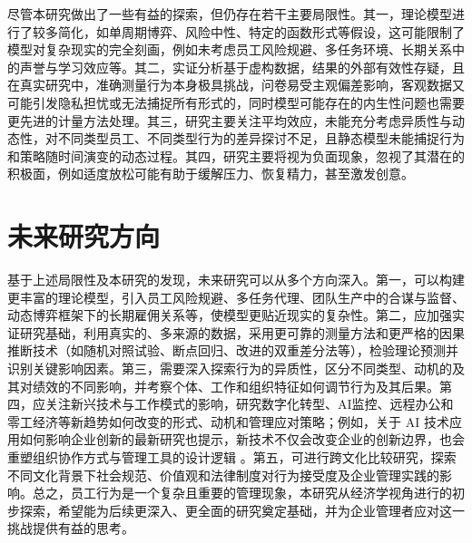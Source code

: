 尽管本研究做出了一些有益的探索，但仍存在若干主要局限性。其一，理论模型进行了较多简化，如单周期博弈、风险中性、特定的函数形式等假设，这可能限制了模型对复杂现实的完全刻画，例如未考虑员工风险规避、多任务环境、长期关系中的声誉与学习效应等。其二，实证分析基于虚构数据，结果的外部有效性存疑，且在真实研究中，准确测量行为本身极具挑战，问卷易受主观偏差影响，客观数据又可能引发隐私担忧或无法捕捉所有形式的，同时模型可能存在的内生性问题也需要更先进的计量方法处理。其三，研究主要关注平均效应，未能充分考虑异质性与动态性，对不同类型员工、不同类型行为的差异探讨不足，且静态模型未能捕捉行为和策略随时间演变的动态过程。其四，研究主要将视为负面现象，忽视了其潜在的积极面，例如适度放松可能有助于缓解压力、恢复精力，甚至激发创意。

\section{未来研究方向}

基于上述局限性及本研究的发现，未来研究可以从多个方向深入。第一，可以构建更丰富的理论模型，引入员工风险规避、多任务代理、团队生产中的合谋与监督、动态博弈框架下的长期雇佣关系等，使模型更贴近现实的复杂性。第二，应加强实证研究基础，利用真实的、多来源的数据，采用更可靠的测量方法和更严格的因果推断技术（如随机对照试验、断点回归、改进的双重差分法等），检验理论预测并识别关键影响因素。第三，需要深入探索行为的异质性，区分不同类型、动机的及其对绩效的不同影响，并考察个体、工作和组织特征如何调节行为及其后果。第四，应关注新兴技术与工作模式的影响，研究数字化转型、AI监控、远程办公和零工经济等新趋势如何改变的形式、动机和管理应对策略；例如，关于 AI 技术应用如何影响企业创新的最新研究也提示，新技术不仅会改变企业的创新边界，也会重塑组织协作方式与管理工具的设计逻辑 \citep{LiYuHuaRenGongZhiNengJiShuYingYongRuHeYingXiangQiYeChuangXin2024}。第五，可进行跨文化比较研究，探索不同文化背景下社会规范、价值观和法律制度对行为接受度及企业管理实践的影响。总之，员工行为是一个复杂且重要的管理现象，本研究从经济学视角进行的初步探索，希望能为后续更深入、更全面的研究奠定基础，并为企业管理者应对这一挑战提供有益的思考。
